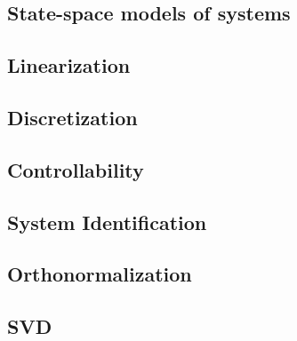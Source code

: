 
\renewcommand{\arraystretch}{1.25}

\subsection*{State-space models of systems}

\subsection*{Linearization}

\subsection*{Discretization}

\subsection*{Controllability}

\subsection*{System Identification}

\subsection*{Orthonormalization}

\subsection*{SVD}